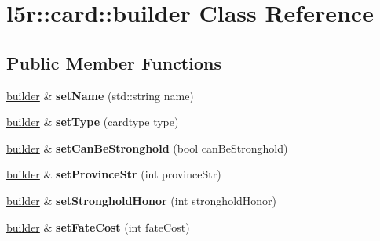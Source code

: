 \hypertarget{classl5r_1_1card_1_1builder}{}\section{l5r\+:\+:card\+:\+:builder Class Reference}
\label{classl5r_1_1card_1_1builder}
\subsection*{Public Member Functions}
\begin{DoxyCompactItemize}
\item 
\mbox{\label{classl5r_1_1card_1_1builder_a5834a7962522144687ea5a8d409a098a}} 
\hyperlink{classl5r_1_1card_1_1builder}{builder} \& {\bfseries set\+Name} (std\+::string name)
\item 
\mbox{\label{classl5r_1_1card_1_1builder_aa96f92ab29ec28c1946ca7d91aec7db5}} 
\hyperlink{classl5r_1_1card_1_1builder}{builder} \& {\bfseries set\+Type} (cardtype type)
\item 
\mbox{\label{classl5r_1_1card_1_1builder_a30e60c2abdc399898c5ab6a8074664e3}} 
\hyperlink{classl5r_1_1card_1_1builder}{builder} \& {\bfseries set\+Can\+Be\+Stronghold} (bool can\+Be\+Stronghold)
\item 
\mbox{\label{classl5r_1_1card_1_1builder_ae33831992640beb376c8212c3c0fa561}} 
\hyperlink{classl5r_1_1card_1_1builder}{builder} \& {\bfseries set\+Province\+Str} (int province\+Str)
\item 
\mbox{\label{classl5r_1_1card_1_1builder_aac84309e54142ca0de46585a546ac12d}} 
\hyperlink{classl5r_1_1card_1_1builder}{builder} \& {\bfseries set\+Stronghold\+Honor} (int stronghold\+Honor)
\item 
\mbox{\label{classl5r_1_1card_1_1builder_a066f6e3940934c1b3155288949d182d4}} 
\hyperlink{classl5r_1_1card_1_1builder}{builder} \& {\bfseries set\+Fate\+Cost} (int fate\+Cost)
\item 
\mbox{\label{classl5r_1_1card_1_1builder_a55f7bc7841d5d452e53e334df290517b}} 

\end{DoxyCompactItemize}
